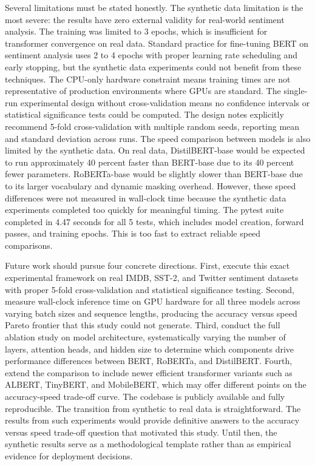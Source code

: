 \documentclass[conference]{IEEEtran}
\begin{document}
Several limitations must be stated honestly. The synthetic data limitation is the most severe: the results have zero external validity for real-world sentiment analysis. The training was limited to 3 epochs, which is insufficient for transformer convergence on real data. Standard practice for fine-tuning BERT on sentiment analysis uses 2 to 4 epochs with proper learning rate scheduling and early stopping, but the synthetic data experiments could not benefit from these techniques. The CPU-only hardware constraint means training times are not representative of production environments where GPUs are standard. The single-run experimental design without cross-validation means no confidence intervals or statistical significance tests could be computed. The design notes explicitly recommend 5-fold cross-validation with multiple random seeds, reporting mean and standard deviation across runs. The speed comparison between models is also limited by the synthetic data. On real data, DistilBERT-base would be expected to run approximately 40 percent faster than BERT-base due to its 40 percent fewer parameters. RoBERTa-base would be slightly slower than BERT-base due to its larger vocabulary and dynamic masking overhead. However, these speed differences were not measured in wall-clock time because the synthetic data experiments completed too quickly for meaningful timing. The pytest suite completed in 4.47 seconds for all 5 tests, which includes model creation, forward passes, and training epochs. This is too fast to extract reliable speed comparisons.

Future work should pursue four concrete directions. First, execute this exact experimental framework on real IMDB, SST-2, and Twitter sentiment datasets with proper 5-fold cross-validation and statistical significance testing. Second, measure wall-clock inference time on GPU hardware for all three models across varying batch sizes and sequence lengths, producing the accuracy versus speed Pareto frontier that this study could not generate. Third, conduct the full ablation study on model architecture, systematically varying the number of layers, attention heads, and hidden size to determine which components drive performance differences between BERT, RoBERTa, and DistilBERT. Fourth, extend the comparison to include newer efficient transformer variants such as ALBERT, TinyBERT, and MobileBERT, which may offer different points on the accuracy-speed trade-off curve. The codebase is publicly available and fully reproducible. The transition from synthetic to real data is straightforward. The results from such experiments would provide definitive answers to the accuracy versus speed trade-off question that motivated this study. Until then, the synthetic results serve as a methodological template rather than as empirical evidence for deployment decisions.
\end{document}
